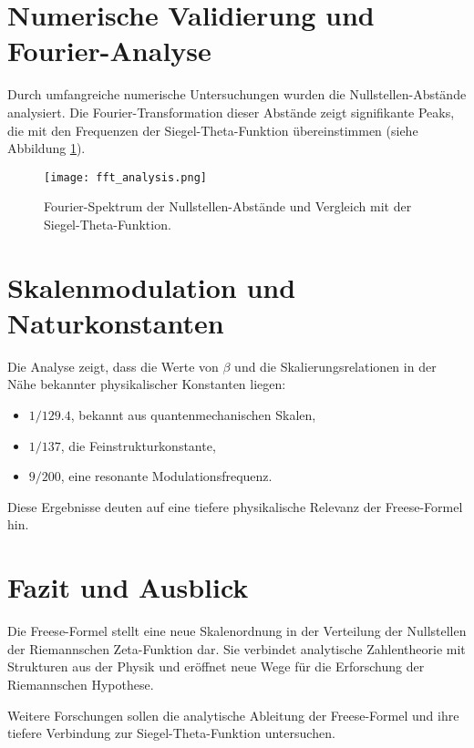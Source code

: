 \documentclass{article}
\begin{document}
\section{Numerische Validierung und Fourier-Analyse}
Durch umfangreiche numerische Untersuchungen wurden die Nullstellen-Abstände analysiert. Die Fourier-Transformation dieser Abstände zeigt signifikante Peaks, die mit den Frequenzen der Siegel-Theta-Funktion übereinstimmen (siehe Abbildung \ref{fig:fft}).

\begin{figure}[h]
    \centering
    \texttt{[image: fft\_analysis.png]}
    \caption{Fourier-Spektrum der Nullstellen-Abstände und Vergleich mit der Siegel-Theta-Funktion.}
    \label{fig:fft}
\end{figure}

\section{Skalenmodulation und Naturkonstanten}
Die Analyse zeigt, dass die Werte von $\beta$ und die Skalierungsrelationen in der Nähe bekannter physikalischer Konstanten liegen:
\begin{itemize}
    \item $1/129.4$, bekannt aus quantenmechanischen Skalen,
    \item $1/137$, die Feinstrukturkonstante,
    \item $9/200$, eine resonante Modulationsfrequenz.
\end{itemize}

Diese Ergebnisse deuten auf eine tiefere physikalische Relevanz der Freese-Formel hin.

\section{Fazit und Ausblick}
Die Freese-Formel stellt eine neue Skalenordnung in der Verteilung der Nullstellen der Riemannschen Zeta-Funktion dar. Sie verbindet analytische Zahlentheorie mit Strukturen aus der Physik und eröffnet neue Wege für die Erforschung der Riemannschen Hypothese.

Weitere Forschungen sollen die analytische Ableitung der Freese-Formel und ihre tiefere Verbindung zur Siegel-Theta-Funktion untersuchen.



\end{document}
